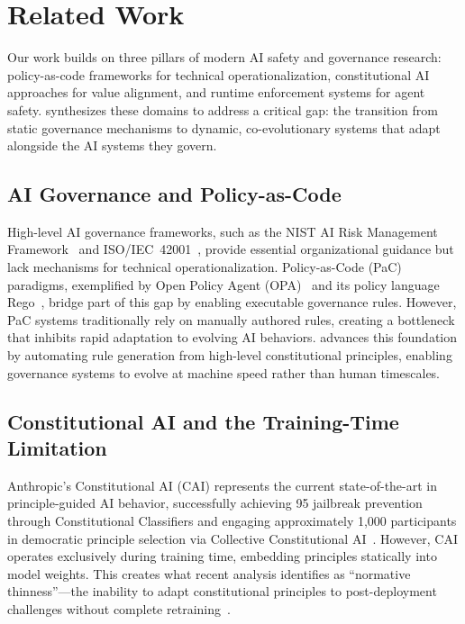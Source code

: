 \section{Related Work}\label{sec:related_work}
Our work builds on three pillars of modern AI safety and governance research: policy-as-code frameworks for technical operationalization, constitutional AI approaches for value alignment, and runtime enforcement systems for agent safety. \acgs{} synthesizes these domains to address a critical gap: the transition from static governance mechanisms to dynamic, co-evolutionary systems that adapt alongside the AI systems they govern.

\subsection{AI Governance and Policy-as-Code}
High-level AI governance frameworks, such as the NIST AI Risk Management Framework~\cite{nist2023ai} and ISO/IEC~42001~\cite{iso42001}, provide essential organizational guidance but lack mechanisms for technical operationalization. Policy-as-Code (PaC) paradigms, exemplified by Open Policy Agent (OPA)~\cite{opa2023} and its policy language Rego~\cite{rego2019}, bridge part of this gap by enabling executable governance rules. However, PaC systems traditionally rely on manually authored rules, creating a bottleneck that inhibits rapid adaptation to evolving AI behaviors. \acgs{} advances this foundation by automating rule generation from high-level constitutional principles, enabling governance systems to evolve at machine speed rather than human timescales.

\subsection{Constitutional AI and the Training-Time Limitation}
Anthropic's Constitutional AI (CAI) represents the current state-of-the-art in principle-guided AI behavior, successfully achieving 95\percent{} jailbreak prevention through Constitutional Classifiers and engaging approximately 1,000 participants in democratic principle selection via Collective Constitutional AI~\cite{anthropic2022constitutional,anthropic2023collective}. However, CAI operates exclusively during training time, embedding principles statically into model weights. This creates what recent analysis identifies as ``normative thinness''---the inability to adapt constitutional principles to post-deployment challenges without complete retraining~\cite{digitalconstitutionalist2023}.


